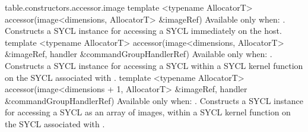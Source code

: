

{table.constructors.accessor.image}
  \addRowThreeL
    { template <typename AllocatorT> }
    { accessor(image<dimensions, AllocatorT> }
    { \&imageRef) }
    {
      Available only when: .
      \newline
      Constructs a SYCL  instance for accessing a SYCL
       immediately on the host.
    }
  \addRowThreeL
    { template <typename AllocatorT> }
    { accessor(image<dimensions, AllocatorT> }
    { \&imageRef, handler \&commandGroupHandlerRef) }
    {
      Available only when: .
      \newline
      Constructs a SYCL  instance for accessing a SYCL
       within a SYCL kernel function on the SYCL
       associated with .
    }
  \addRowThreeL
    { template <typename AllocatorT> }
    { accessor(image<dimensions + 1, AllocatorT> }
    { \&imageRef, handler \&commandGroupHandlerRef) }
    {
      Available only when: .
      \newline
      Constructs a SYCL  instance for accessing a SYCL
       as an array of images, within a SYCL kernel function on
      the SYCL  associated with .
    }
\completeTable


